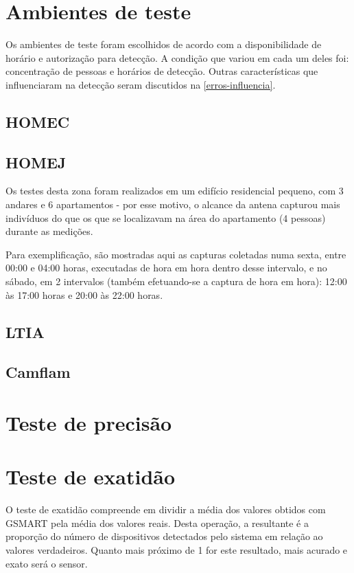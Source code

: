 \section{Ambientes de teste}
Os ambientes de teste foram escolhidos de acordo com a disponibilidade de horário e autorização
para detecção. A condição que variou em cada um deles foi: concentração de pessoas e horários de detecção.
Outras características que influenciaram na detecção seram discutidos na \autoref{erros-influencia}.

\subsection{HOMEC}

\subsection{HOMEJ}
Os testes desta zona foram realizados em um edifício residencial pequeno, com 3
andares e 6 apartamentos - por esse motivo, o alcance da antena capturou mais
indivíduos do que os que se localizavam na área do apartamento (4 pessoas)
durante as medições.

Para exemplificação, são mostradas aqui as capturas coletadas numa sexta, entre
00:00 e 04:00 horas, executadas de hora em hora dentro desse intervalo, e no
sábado, em 2 intervalos (também efetuando-se a captura de hora em hora): 12:00
às 17:00 horas e 20:00 às 22:00 horas.

\subsection{LTIA}

\subsection{Camflam}

\section{Teste de precisão}

\section{Teste de exatidão}
O teste de exatidão compreende em dividir a média dos valores obtidos com GSMART
pela média dos valores reais. Desta operação, a resultante é a proporção do
número de dispositivos detectados pelo sistema em relação ao valores
verdadeiros. Quanto mais próximo de 1 for este resultado, mais acurado e exato
será o sensor.

